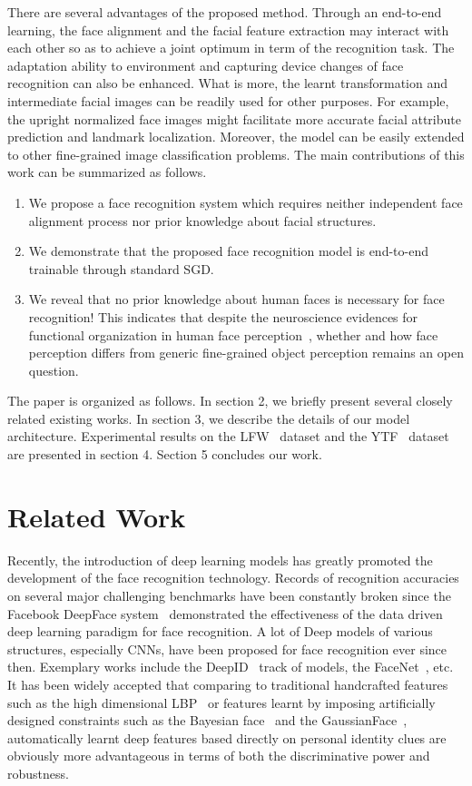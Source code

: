 \documentclass[10pt,twocolumn,letterpaper]{article}
\begin{document}
There are several advantages of the proposed method. 
Through an end-to-end learning, the face alignment and the facial feature extraction may interact with each other so as to achieve a joint optimum in term of the recognition task. 
The adaptation ability to environment and capturing device changes of face recognition can also be enhanced. 
What is more, the learnt transformation and intermediate facial images can be readily used for other purposes. 
For example, the upright normalized face images might facilitate more accurate facial attribute prediction and landmark localization. 
Moreover, the model can be easily extended to other fine-grained image classification problems. 
The main contributions of this work can be summarized as follows.
\begin{enumerate}
	\item We propose a face recognition system which requires neither independent face alignment process nor prior knowledge about facial structures.
	\item We demonstrate that the proposed face recognition model is end-to-end trainable through standard SGD.
	\item We reveal that no prior knowledge about human faces is necessary for face recognition! This indicates that despite the neuroscience evidences for functional organization in human face perception~\cite{Kanwisher1997The}, whether and how face perception differs from generic fine-grained object perception remains an open question.
\end{enumerate}

The paper is organized as follows. In section 2, we briefly present several closely related existing works. In section 3, we describe the details of our model architecture. Experimental results on the LFW~\cite{LFWTech} dataset and the YTF~\cite{Wolf2011Face} dataset are presented in section 4. Section 5 concludes our work.


\section{Related Work}

Recently, the introduction of deep learning models has greatly promoted the development of the face recognition technology. 
Records of recognition accuracies on several major challenging benchmarks have been constantly broken since the Facebook DeepFace system~\cite{taigman2014deepface} demonstrated the effectiveness of the data driven deep learning paradigm for face recognition. 
A lot of Deep models of various structures, especially CNNs, have been proposed for face recognition ever since then. 
Exemplary works include the DeepID~\cite{sun2014deep,sun2015deeply,sun2015deepid3} track of models, the FaceNet~\cite{schroff2015facenet}, etc. 
It has been widely accepted that comparing to traditional handcrafted features such as the high dimensional LBP~\cite{chen2013blessing} or features learnt by imposing artificially designed constraints such as the Bayesian face~\cite{chen2012bayesian} and the GaussianFace~\cite{lu2014surpassing}, automatically learnt deep features 	 based directly on personal identity clues are obviously more advantageous in terms of both the discriminative power and robustness. 
\end{document}
